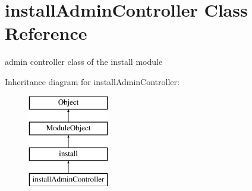 \hypertarget{classinstallAdminController}{}\section{install\+Admin\+Controller Class Reference}
\label{classinstallAdminController}


admin controller class of the install module  


Inheritance diagram for install\+Admin\+Controller\+:\begin{figure}[H]
\begin{center}
\leavevmode
\includegraphics[height=4.000000cm]{classinstallAdminController}
\end{center}
\end{figure}
